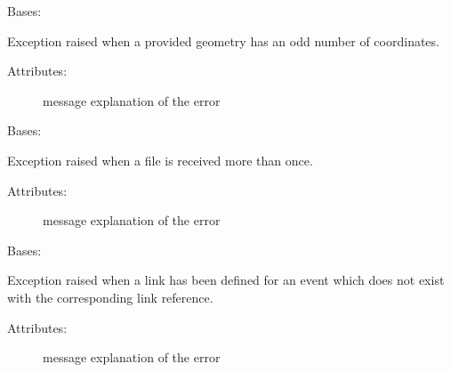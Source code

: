 
\begin{fulllineitems}
\label{\detokenize{gsdm.engine:gsdm.engine.errors.OddNumberOfCoordinates}}
Bases: {\hyperref[\detokenize{gsdm.engine:gsdm.engine.errors.Error}]{}}

Exception raised when a provided geometry has an odd number of coordinates.
\begin{description}
\item[{Attributes:}] \leavevmode
message \textendash{} explanation of the error

\end{description}

\end{fulllineitems}


\begin{fulllineitems}
\label{\detokenize{gsdm.engine:gsdm.engine.errors.SourceAlreadyIngested}}
Bases: {\hyperref[\detokenize{gsdm.engine:gsdm.engine.errors.Error}]{}}

Exception raised when a file is received more than once.
\begin{description}
\item[{Attributes:}] \leavevmode
message \textendash{} explanation of the error

\end{description}

\end{fulllineitems}


\begin{fulllineitems}
\label{\detokenize{gsdm.engine:gsdm.engine.errors.UndefinedEventLink}}
Bases: {\hyperref[\detokenize{gsdm.engine:gsdm.engine.errors.Error}]{}}

Exception raised when a link has been defined for an event which does not exist with the corresponding link reference.
\begin{description}
\item[{Attributes:}] \leavevmode
message \textendash{} explanation of the error

\end{description}

\end{fulllineitems}

